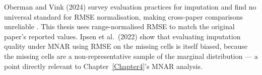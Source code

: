 Oberman and Vink (2024) survey evaluation practices for imputation and find no universal standard for RMSE normalisation, making cross-paper comparisons unreliable \cite{ObermanVink2024}. This thesis uses range-normalised RMSE to match the original paper's reported values. Ipsen et al.\ (2022) show that evaluating imputation quality under MNAR using RMSE on the missing cells is itself biased, because the missing cells are a non-representative sample of the marginal distribution \cite{Ipsen2022} --- a point directly relevant to Chapter~\ref{Chapter4}'s MNAR analysis.
